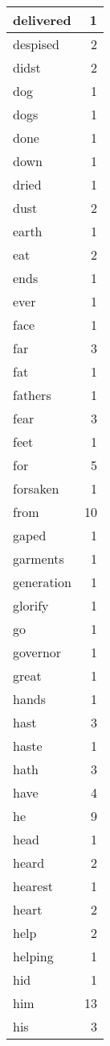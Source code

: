 \begin{center}
\begin{longtable}{l|r}
delivered & 1 \\ \hline
despised & 2 \\ \hline
didst & 2 \\ \hline
dog & 1 \\ \hline
dogs & 1 \\ \hline
done & 1 \\ \hline
down & 1 \\ \hline
dried & 1 \\ \hline
dust & 2 \\ \hline
earth & 1 \\ \hline
eat & 2 \\ \hline
ends & 1 \\ \hline
ever & 1 \\ \hline
face & 1 \\ \hline
far & 3 \\ \hline
fat & 1 \\ \hline
fathers & 1 \\ \hline
fear & 3 \\ \hline
feet & 1 \\ \hline
for & 5 \\ \hline
forsaken & 1 \\ \hline
from & 10 \\ \hline
gaped & 1 \\ \hline
garments & 1 \\ \hline
generation & 1 \\ \hline
glorify & 1 \\ \hline
go & 1 \\ \hline
governor & 1 \\ \hline
great & 1 \\ \hline
hands & 1 \\ \hline
hast & 3 \\ \hline
haste & 1 \\ \hline
hath & 3 \\ \hline
have & 4 \\ \hline
he & 9 \\ \hline
head & 1 \\ \hline
heard & 2 \\ \hline
hearest & 1 \\ \hline
heart & 2 \\ \hline
help & 2 \\ \hline
helping & 1 \\ \hline
hid & 1 \\ \hline
him & 13 \\ \hline
his & 3 \\ \hline

\end{longtable}
\end{center}
